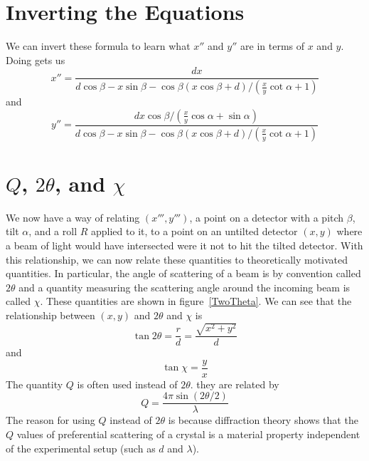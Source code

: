 \section{Inverting the Equations}

We can invert these formula to learn what
$x''$ and $y''$ are in terms of $x$ and $y$.
Doing gets us
\begin{equation}
    x''=\frac{dx}{d\cos\beta-x\sin\beta-
    \cos\beta(x\cos\beta+d)/(\tfrac{x}{y}\cot\alpha+1)}
\end{equation}
and
\begin{equation}
    y''=\frac{dx\cos\beta/(\tfrac{x}{y}\cos\alpha+\sin\alpha)}
    {d\cos\beta-x\sin\beta-
    \cos\beta(x\cos\beta+d)/(\tfrac{x}{y}\cot\alpha+1)}
\end{equation}

\section{\texorpdfstring{$Q$, $2\theta$, and $\chi$}{Q, 2theta, and chi}}

\begin{SCfigure}[1][tb]
    \centering
    
    \caption{For a particular point $(x,y)$, we
    always associate two quantities: $2\theta$ and $\chi$.
    $2\theta$ is the angle of scattering 
    of the beam, or the angle that an incoming beam is 
    deflected by when it diffracts off the crystal. 
    $\chi$ is a measure of the azimuthal angle around 
    the beam. It tells you in what direction radially 
    outwards (with respect to the undeflected beam) 
    the outgoing beam was was scattered.}
    \label{TwoTheta}
\end{SCfigure}

We now have a way of relating $(x''',y''')$, 
a point on a detector with a pitch $\beta$, 
tilt $\alpha$, and a roll $R$ applied to it, 
to a point on an untilted detector $(x,y)$
where a beam of light would have intersected
were it not to hit the tilted detector.
With this relationship, we can now relate
these quantities to theoretically motivated 
quantities. In particular, the angle of scattering 
of a beam is by convention called $2\theta$ and a 
quantity measuring the scattering angle around the 
incoming beam is called $\chi$. These quantities 
are shown in figure~\ref{TwoTheta}. We can see that 
the relationship between $(x,y)$ and $2\theta$ and 
$\chi$ is
\begin{equation}\label{2thetatermsr}
    \tan2\theta = \frac{r}{d} = \frac{\sqrt{x^2+y^2}}{d}
\end{equation}
and
\begin{equation}\label{chitermsyx}
    \tan\chi = \frac{y}{x}
\end{equation}
The quantity $Q$ is often used instead of $2\theta$. 
they are related by
\begin{equation}\label{qterms2theta}
    Q = \frac{4\pi \sin(2\theta/2)}{\lambda}
\end{equation}
The reason for using $Q$ instead of $2\theta$ is because 
diffraction theory shows that the $Q$ values of preferential 
scattering of a crystal is a material property independent 
of the experimental setup (such as $d$ and $\lambda$). 


